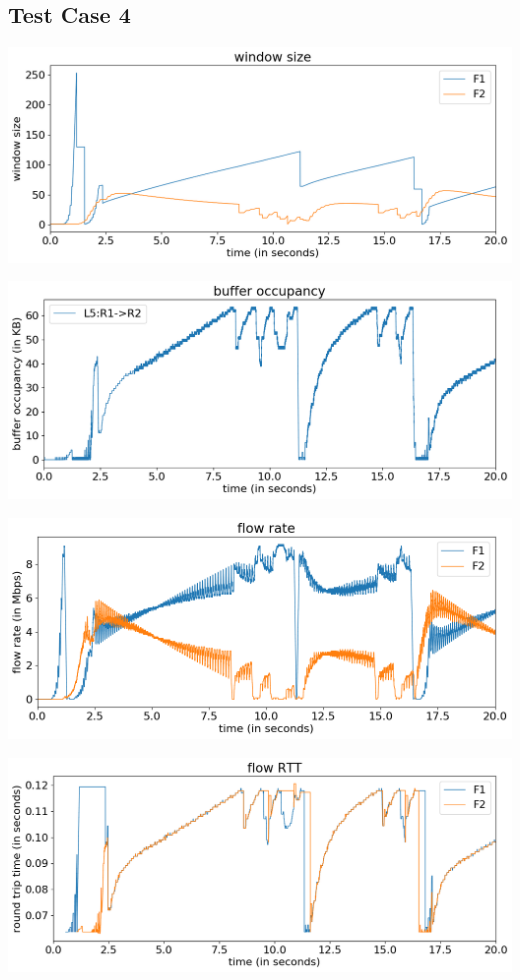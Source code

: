 \documentclass{article}
\begin{document}
\subsection{Test Case 4}

\includegraphics[width = \textwidth]{"test_case4 window size"}

\includegraphics[width = \textwidth]{"test_case4 buffer occupancy"}

\includegraphics[width = \textwidth]{"test_case4 flow rate"}

\includegraphics[width = \textwidth]{"test_case4 flow RTT"}
\end{document}
